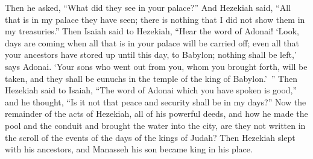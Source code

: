 \begin{biblechapter}
\verse Then he asked, “What did they see in your palace?” And Hezekiah said, “All that is in my palace they have seen; there is nothing that I did not show them in my treasuries.”
\verse Then Isaiah said to Hezekiah, “Hear the word of Adonai!
\verse ‘Look, days are coming when all that is in your palace will be carried off; even all that your ancestors have stored up until this day, to Babylon; nothing shall be left,’ says Adonai.
\verse ‘Your sons who went out from you, whom you brought forth, will be taken, and they shall be eunuchs in the temple of the king of Babylon.’ ”
\verse Then Hezekiah said to Isaiah, “The word of Adonai which you have spoken is good,” and he thought, “Is it not that peace and security shall be in my days?”
\verse Now the remainder of the acts of Hezekiah, all of his powerful deeds, and how he made the pool and the conduit and brought the water into the city, are they not written in the scroll of the events of the days of the kings of Judah?
\verse Then Hezekiah slept with his ancestors, and Manasseh his son became king in his place.
\end{biblechapter}

